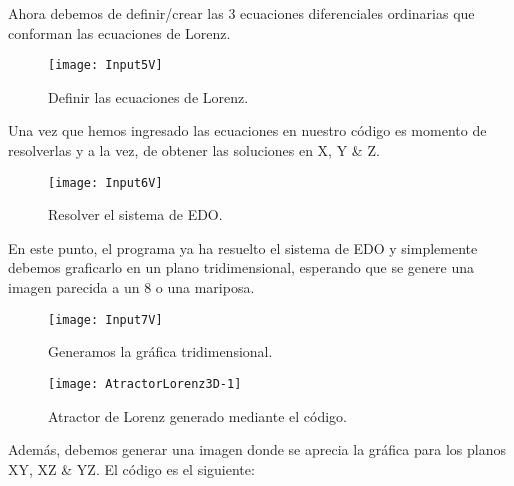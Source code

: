 \vfill
\vline
\space
\par \vspace{2cm}

Ahora debemos de definir/crear las 3 ecuaciones diferenciales ordinarias que conforman las ecuaciones de Lorenz.

\begin{figure}[h!]
	\begin{center}
		\texttt{[image: Input5V]}
        \caption{Definir las ecuaciones de Lorenz.}
        \label{fig4:Lorenz}
	\end{center}
\end{figure}

Una vez que hemos ingresado las ecuaciones en nuestro código es momento de resolverlas y a la vez, de obtener las soluciones en X, Y \& Z.

\begin{figure}[h!]
	\begin{center}
		\texttt{[image: Input6V]}
        \caption{Resolver el sistema de EDO.}
        \label{fig5:Resolver}
	\end{center}
\end{figure}

\vfill
\vline
\space
\par \vspace{4.5cm}

En este punto, el programa ya ha resuelto el sistema de EDO y simplemente debemos graficarlo en un plano tridimensional, esperando que se genere una imagen parecida a un 8 o una mariposa.

\begin{figure}[h!]
	\begin{center}
		\texttt{[image: Input7V]}
        \caption{Generamos la gráfica tridimensional.}
        \label{fig6:Atractor}
	\end{center}
\end{figure}

\begin{figure}[h!]
	\begin{center}
		\texttt{[image: AtractorLorenz3D-1]}
        \caption{Atractor de Lorenz generado mediante el código.}
        \label{fig7:GrafAtractor}
	\end{center}
\end{figure}

Además, debemos generar una imagen donde se aprecia la gráfica para los planos XY, XZ \& YZ. El código es el siguiente:

